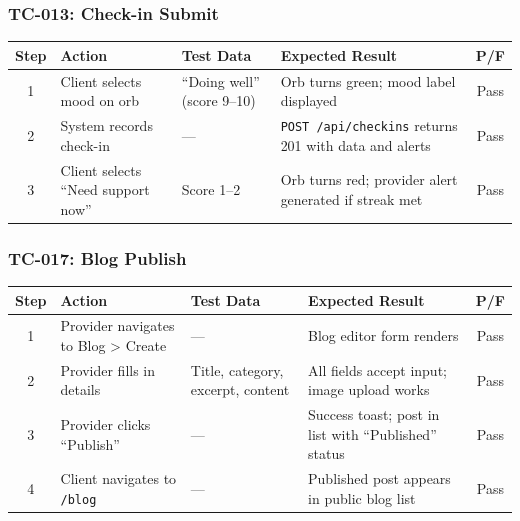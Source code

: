 \documentclass[12pt,letterpaper]{article}
\begin{document}
\subsubsection*{TC-013: Check-in Submit}

\begin{table}[!htbp]
\centering
\small
\begin{tabularx}{\textwidth}{|c|>{\raggedright\arraybackslash}X|>{\raggedright\arraybackslash}p{3cm}|>{\raggedright\arraybackslash}X|c|}
\hline
\rowcolor{TableHeader}\textcolor{TableHeaderText}{\textbf{Step}} & \textcolor{TableHeaderText}{\textbf{Action}} & \textcolor{TableHeaderText}{\textbf{Test Data}} & \textcolor{TableHeaderText}{\textbf{Expected Result}} & \textcolor{TableHeaderText}{\textbf{P/F}} \\
\hline
1 & Client selects mood on orb & ``Doing well'' (score 9--10) & Orb turns green; mood label displayed & Pass \\
\hline
\rowcolor{TableRowAlt}
2 & System records check-in & --- & \texttt{POST /api/checkins} returns 201 with data and alerts & Pass \\
\hline
3 & Client selects ``Need support now'' & Score 1--2 & Orb turns red; provider alert generated if streak met & Pass \\
\hline
\end{tabularx}
\end{table}

\subsubsection*{TC-017: Blog Publish}

\begin{table}[!htbp]
\centering
\small
\begin{tabularx}{\textwidth}{|c|>{\raggedright\arraybackslash}X|>{\raggedright\arraybackslash}p{3cm}|>{\raggedright\arraybackslash}X|c|}
\hline
\rowcolor{TableHeader}\textcolor{TableHeaderText}{\textbf{Step}} & \textcolor{TableHeaderText}{\textbf{Action}} & \textcolor{TableHeaderText}{\textbf{Test Data}} & \textcolor{TableHeaderText}{\textbf{Expected Result}} & \textcolor{TableHeaderText}{\textbf{P/F}} \\
\hline
1 & Provider navigates to Blog > Create & --- & Blog editor form renders & Pass \\
\hline
\rowcolor{TableRowAlt}
2 & Provider fills in details & Title, category, excerpt, content & All fields accept input; image upload works & Pass \\
\hline
3 & Provider clicks ``Publish'' & --- & Success toast; post in list with ``Published'' status & Pass \\
\hline
\rowcolor{TableRowAlt}
4 & Client navigates to \texttt{/blog} & --- & Published post appears in public blog list & Pass \\
\hline
\end{tabularx}
\end{table}
\end{document}
